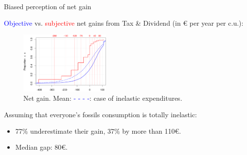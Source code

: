 \documentclass[aspectratio=169,9pt,dvipsnames]{beamer}
\begin{document}
\begin{frame}{Biased perception of net gain}\label{biased_perception_CDF}

    \textcolor{blue}{Objective} vs. \textcolor{red}{subjective} net gains from Tax \& Dividend (in \euro{} per year per c.u.): \hyperlink{biased_perception_PDF}{}
    
    \begin{figure}
      \includegraphics[width=0.4\textwidth]{Images/cdf_carbon_tax_all.png}
      \caption{Net gain. Mean: \textcolor{blue}{- - - -}: case of inelastic expenditures.}
    \end{figure}
    
    \bigskip
    
    
    
    Assuming that everyone's fossils consumption is totally inelastic: \vspace{0.1cm}
    \begin{itemize}
        \item 77\% underestimate their gain, 37\% by more than 110\euro{}.  \vspace{0.1cm}
        \item Median gap: 80\euro{}.
    \end{itemize}
    
    
\end{frame}
\end{document}
